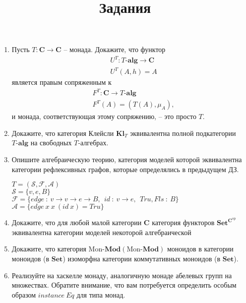 \documentclass[draft]{article}
\newcommand{\cat}[1]{\mathbf{#1}}
\renewcommand{\C}{\cat{C}}
\newcommand{\Set}{\cat{Set}}
\newcommand{\fs}[1]{\mathrm{#1}}
\newcommand{\Mod}[1]{#1\text{-}\cat{Mod}}
\begin{document}
\title{Задания}
\maketitle

\begin{enumerate}

\item Пусть $T : \C \to \C$ -- монада.
Докажите, что функтор
\begin{align*}
& U^T : T\text{-}\cat{alg} \to \C \\
& U^T(A,h) = A
\end{align*}
является правым сопряженным к
\begin{align*}
& F^T : \C \to T\text{-}\cat{alg} \\
& F^T(A) = (T(A), \mu_A),
\end{align*}
и монада, соответствующая этому сопряжению, -- это просто $T$.

\item Докажите, что категория Клейсли $\cat{Kl}_T$ эквивалентна полной подкатегории $T\text{-}\cat{alg}$ на свободных $T$-алгебрах.



\item Опишите алгебраическую теорию, категория моделей которой эквивалентна категории рефлексивных графов, которые определялись в предыдущем ДЗ.

$T = (\mathcal{S},\mathcal{F}, \mathcal{A})$\\
$\mathcal{S} = \{v, e, B\}$\\
$\mathcal{F} = \{edge~:~v\to v \to e \to B,~~id~:~v \to e, ~~Tru, Fls ~:~ B\}$\\
$\mathcal{A} = \{edge~x~x ~(id~x ) = Tru\}$

\item Докажите, что для любой малой категории $\C$ категория функторов $\Set^{\C^\fs{op}}$ эквивалентна категории моделей некоторой алгебраической 

\item Докажите, что категория $\Mod{\fs{Mon}}(\Mod{\fs{Mon}})$ моноидов в категории моноидов (в $\Set$) изоморфна категории коммутативных моноидов (в $\Set$).

\item Реализуйте на хаскелле монаду, аналогичную монаде абелевых групп на множествах.
Обратите внимание, что вам потребуется определить особым образом $\mathit{instance}\ \mathit{Eq}$ для типа монад.


\end{enumerate}
\end{document}

